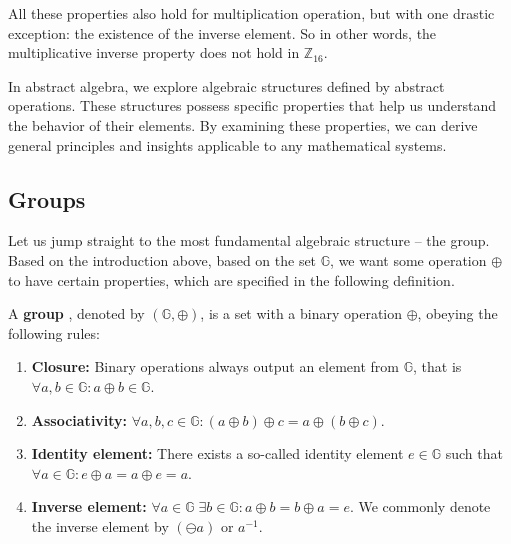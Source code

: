\documentclass[../lecture-notes-148x210.tex]{subfiles}
\begin{document}
\vspace{-4mm}

\begin{remark}
    All these properties also hold for multiplication operation, but with one 
    drastic exception: the existence of the inverse element. So in other words, the multiplicative 
    inverse property does not hold in $\mathbb{Z}_{16}$.
\end{remark}

\vspace{-1.3mm}

In abstract algebra, we explore algebraic structures defined by abstract operations. These 
structures possess specific properties that help us understand the behavior of their elements.
By examining these properties, we can derive general principles and insights applicable to 
any mathematical systems.

\subsection{Groups}

Let us jump straight to the most fundamental algebraic structure -- the group. Based on the introduction 
above, based on the set $\mathbb{G}$, we want some operation $\oplus$ to have certain properties, which 
are specified in the following definition.

\begin{definition}
    A \textbf{group} \cite[section 3]{Judson_2012}, denoted by $(\mathbb{G}, \oplus)$, is a set with a binary operation $\oplus$, obeying the following rules:
    \begin{enumerate}
        \item \textbf{Closure:} Binary operations always output an element from $\mathbb{G}$, that is $\forall a,b \in \mathbb{G}: a \oplus b \in \mathbb{G}$.
        \item \textbf{Associativity:} $\forall a,b,c \in \mathbb{G}: (a \oplus b)\oplus c = a \oplus (b \oplus c)$.
        \item \textbf{Identity element:} There exists a so-called identity element $e \in \mathbb{G}$ such that $\forall a \in \mathbb{G}: e \oplus a = a \oplus e = a$.
        \item \textbf{Inverse element:} $\forall a \in \mathbb{G} \; \exists b \in \mathbb{G}: a\oplus b = b \oplus a = e$. We commonly denote the inverse element by $(\ominus a)$ or $a^{-1}$.
    \end{enumerate}
\end{definition}
\end{document}

